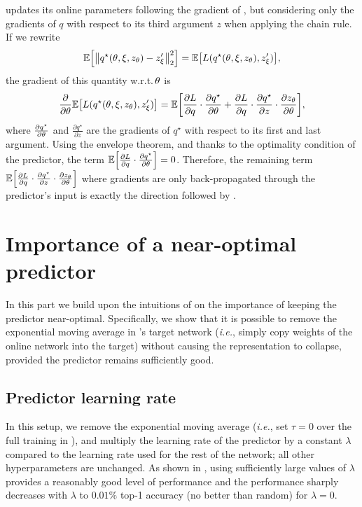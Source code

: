 \algo updates its online parameters following the gradient of , but considering only the gradients of $q$ with respect to its third argument $z$ when applying the chain rule. If we rewrite
\begin{align}
    \EE{\normtwo{q^\star(\netparams, \targetparams, z_\netparams) - z'_\targetparams}^2} = 
    \EE{L(q^\star(\netparams, \targetparams, z_\netparams), z'_\targetparams)},
\end{align}
the gradient of this quantity w.r.t.\,${\theta}$ is
\begin{align}
    \frac{\partial}{\partial \netparams}
    \EE{L(q^\star(\netparams, \targetparams, z_\netparams), z'_\targetparams)} = 
    \EE{\frac{\partial L}{\partial q}\cdot\frac{\partial q^\star}{\partial \netparams} + 
    \frac{\partial L}{\partial q}\cdot\frac{\partial q^\star}{\partial z}\cdot\frac{\partial z_\netparams}{\partial \netparams}},
\end{align}
where $\frac{\partial q^\star}{\partial {\theta}}$ and $\frac{\partial q^\star}{\partial z}$ are the gradients of $q^\star$ with respect to its first and last argument. 
Using the envelope theorem, and thanks to the optimality condition of the predictor, the term $\EE{\frac{\partial L}{\partial q}\cdot\frac{\partial q^\star}{\partial \netparams}} = 0$. Therefore, the remaining term $\EE{\frac{\partial L}{\partial q}\cdot\frac{\partial q^\star}{\partial z}\cdot\frac{\partial z_\netparams}{\partial \netparams}}$ where gradients are only back-propagated through the predictor's input is exactly the direction followed by \algo. 

\section{Importance of a near-optimal predictor}
\label{app:importance_no_pred}
In this part we build upon the intuitions of  on the importance of keeping the predictor near-optimal. Specifically, we show that it is possible to remove the exponential moving average in \algo's target network (\emph{i.e.}, simply copy weights of the online network into the target) without causing the representation to collapse, provided the predictor remains sufficiently good.

\subsection{Predictor learning rate}
In this setup, we remove the exponential moving average (\emph{i.e.}, set $\tau = 0$ over the full training in ), and multiply the learning rate of the predictor by a constant $\lambda$ compared to the learning rate used for the rest of the network; all other hyperparameters are unchanged. As shown in , using sufficiently large values of $\lambda$ provides a reasonably good level of performance 
and the performance sharply decreases with $\lambda$
to %
$0.01\%$ top-1 accuracy (no better than random) for $\lambda = 0$.

